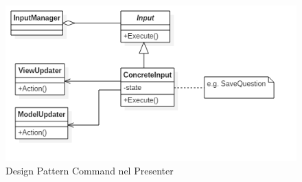 	\begin{figure}[h!]
	\begin{center}
		\includegraphics[scale=0.7]{../images/PresenterCommandDesignPattern.png}
		\caption{Design Pattern Command nel Presenter}
	\end{center}
	\end{figure}
	\newpage